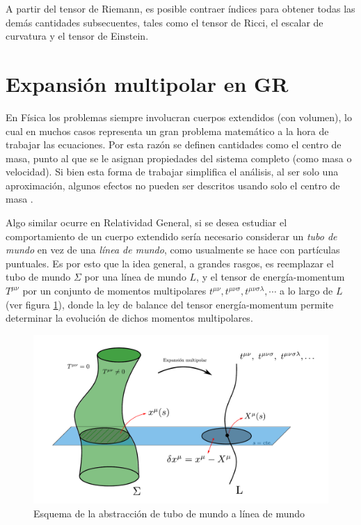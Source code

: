 A partir del tensor de Riemann, es posible contraer índices para obtener todas las demás cantidades subsecuentes, tales como el tensor de Ricci, el escalar de curvatura y el tensor de Einstein.

\section{Expansión multipolar en GR}

En Física los problemas siempre involucran cuerpos extendidos (con volumen), lo cual en muchos casos representa un gran problema matemático a la hora de trabajar las ecuaciones. Por esta razón se definen cantidades como el centro de masa, punto al que se le asignan propiedades del sistema completo (como masa o velocidad). Si bien esta forma de trabajar simplifica el análisis, al ser solo una aproximación, algunos efectos no pueden ser descritos usando solo el centro de masa \cite{nataly}.

Algo similar ocurre en Relatividad General, si se desea estudiar el comportamiento de un cuerpo extendido sería necesario considerar un \textit{tubo de mundo} en vez de una \textit{línea de mundo}, como usualmente se hace con partículas puntuales. Es por esto que la idea general, a grandes rasgos, es reemplazar el tubo de mundo $\Sigma$ por una línea de mundo $L$, y el tensor de energía-momentum $T^{\mu \nu}$ por un conjunto de momentos multipolares $t^{\mu \nu}, t^{\mu \nu \sigma}, t^{\mu \nu \sigma \lambda}, \cdots$ a lo largo de $L$ (ver figura \ref{fig:1}), donde la ley de balance del tensor energía-momentum permite determinar la evolución de dichos momentos multipolares.
\begin{figure}[!ht]
	\centering
	\includegraphics[scale=0.45]{images/papapetrou.pdf}
	\caption[Expansión multipolar en RG]{Esquema de la abstracción de tubo de mundo a línea de mundo}
	\label{fig:1}
\end{figure}

